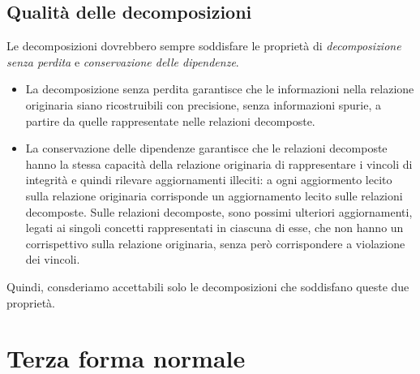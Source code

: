 \documentclass[12pt]{report}
\begin{document}
	\subsection{Qualità delle decomposizioni}
	Le decomposizioni dovrebbero sempre soddisfare le proprietà di \textit{decomposizione senza perdita} e \textit{conservazione delle dipendenze}.
	\begin{itemize}
		\item La decomposizione senza perdita garantisce che le informazioni nella relazione originaria siano ricostruibili con precisione, senza informazioni spurie, a partire da quelle rappresentate nelle relazioni decomposte.
		\item La conservazione delle dipendenze garantisce che le relazioni decomposte hanno la stessa capacità della relazione originaria di rappresentare i vincoli di integrità e quindi rilevare aggiornamenti illeciti: a ogni aggiormento lecito sulla relazione originaria corrisponde un aggiornamento lecito sulle relazioni decomposte. Sulle relazioni decomposte, sono possimi ulteriori aggiornamenti, legati ai singoli concetti rappresentati in ciascuna di esse, che non hanno un corrispettivo sulla relazione originaria, senza però corrispondere a violazione dei vincoli.
	\end{itemize}
	Quindi, consderiamo accettabili solo le decomposizioni che soddisfano queste due proprietà.
	\section{Terza forma normale}
\end{document}
